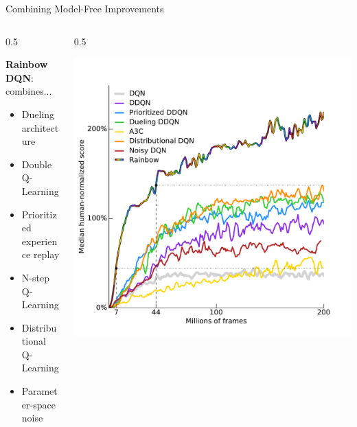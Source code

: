 \documentclass[9pt]{beamer}
\newcommand{\twocolumns}[4]{
\begin{columns}
\begin{column}{#1\textwidth}
    #3
\end{column}
\begin{column}{#2\textwidth}
	#4
\end{column}
\end{columns}
}
\begin{document}
\begin{frame}{Combining Model-Free Improvements}
\twocolumns{0.5}{0.5}{
\textbf{Rainbow DQN}: combines...
\begin{itemize}
\item Dueling architecture
\item Double Q-Learning
\item Prioritized experience replay
\item N-step Q-Learning
\item Distributional Q-Learning
\item Parameter-space noise
\end{itemize}
}{
\includegraphics[width=\textwidth]{p2-rainbow}
}

\end{frame}
\end{document}
